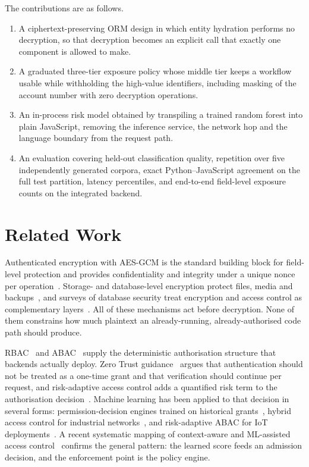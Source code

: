 \documentclass[a4paper,conference]{IEEEtran}
\begin{document}
The contributions are as follows.
\begin{enumerate}
\item A ciphertext-preserving ORM design in which entity hydration performs no decryption, so
      that decryption becomes an explicit call that exactly one component is allowed to make.
\item A graduated three-tier exposure policy whose middle tier keeps a workflow usable while
      withholding the high-value identifiers, including masking of the account number with zero
      decryption operations.
\item An in-process risk model obtained by transpiling a trained random forest into plain
      JavaScript, removing the inference service, the network hop and the language boundary from
      the request path.
\item An evaluation covering held-out classification quality, repetition over five independently
      generated corpora, exact Python--JavaScript agreement on the full test partition, latency
      percentiles, and end-to-end field-level exposure counts on the integrated backend.
\end{enumerate}

\section{Related Work}

Authenticated encryption with AES-GCM is the standard building block for field-level protection
and provides confidentiality and integrity under a unique nonce per operation~\cite{gcm}.
Storage- and database-level encryption protect files, media and backups~\cite{tde,atrest}, and
surveys of database security treat encryption and access control as complementary
layers~\cite{dbsurvey}. All of these mechanisms act before decryption. None of them constrains
how much plaintext an already-running, already-authorised code path should produce.

RBAC~\cite{rbac} and ABAC~\cite{abac,abacopen} supply the deterministic authorisation structure
that backends actually deploy. Zero Trust guidance~\cite{zta,zt5} argues that authentication
should not be treated as a one-time grant and that verification should continue per request, and
risk-adaptive access control adds a quantified risk term to the authorisation
decision~\cite{riskabac}. Machine learning has been applied to that decision in several
forms: permission-decision engines trained on historical grants~\cite{mlengine}, hybrid access
control for industrial networks~\cite{scada}, and risk-adaptive ABAC for IoT
deployments~\cite{riskabac}. A recent systematic mapping of context-aware and ML-assisted access
control~\cite{survey} confirms the general pattern: the learned score feeds an admission
decision, and the enforcement point is the policy engine.
\end{document}
